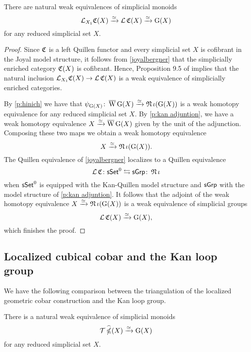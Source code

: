 \begin{lemma} \label{CandG}
	There are natural weak equivalences of simplicial monoids
	\[
	\operatorname{\mathcal{L}}_{X_1} \! \operatorname{\mathfrak{C}}(X) \xrightarrow{\simeq} \operatorname{\mathcal{L}} \operatorname{\mathfrak{C}}(X) \xrightarrow{\simeq} \operatorname{G}(X)
	\]
	for any reduced simplicial set $X$.
\end{lemma}

\begin{proof}
	Since $\operatorname{\mathfrak{C}}$ is a left Quillen functor and every simplicial set $X$ is cofibrant in the Joyal model structure, it follows from \cref{joyalbergner} that the simplicially enriched category $\operatorname{\mathfrak{C}}(X)$ is cofibrant.
	Hence, Proposition 9.5 of \cite{dwyer1980simplicial} implies that the natural inclusion $\operatorname{\mathcal{L}}_{X_1} \! \operatorname{\mathfrak{C}}(X) \to \operatorname{\mathcal{L}} \operatorname{\mathfrak{C}}(X)$ is a weak equivalence of simplicially enriched categories.

	By \cref{p:hinich} we have that $\psi_{\operatorname{G}(X)} \colon \operatorname{\overline{W}} \operatorname{G}(X) \xrightarrow{\simeq} \operatorname{\mathfrak{N}} \iota(\operatorname{G}(X))$ is a weak homotopy equivalence for any reduced simplicial set $X$.
	By \cref{p:kan adjuntion}, we have a weak homotopy equivalence $X \xrightarrow{\simeq} \operatorname{\overline{W}} \operatorname{G}(X)$ given by the unit of the adjunction.
	Composing these two maps we obtain a weak homotopy equivalence
	\[
	X \xrightarrow{\simeq} \operatorname{\mathfrak{N}}\iota(\operatorname{G}(X)).
	\]
	The Quillen equivalence of \cref{joyalbergner} localizes to a Quillen equivalence
	\[
	\operatorname{\mathcal{L}} \operatorname{\mathfrak{C}} \colon \mathsf{sSet}^0 \leftrightarrows \mathsf{sGrp} \colon \operatorname{\mathfrak{N}} \iota
	\]
	when $\mathsf{sSet}^0$ is equipped with the Kan-Quillen model structure and $\mathsf{sGrp}$ with the model structure of \cref{p:kan adjuntion}.
	It follows that the adjoint of the weak homotopy equivalence $X \xrightarrow{\simeq} \operatorname{\mathfrak{N}} \iota(\operatorname{G}(X))$ is a weak equivalence of simplicial groups
	\[
	\operatorname{\mathcal{L}} \operatorname{\mathfrak{C}}(X) \xrightarrow{\simeq} \operatorname{G}(X),
	\]
	which finishes the proof.
\end{proof}


\subsection{Localized cubical cobar and the Kan loop group}

We have the following comparison between the triangulation of the localized geometric cobar construction and the Kan loop group.

\begin{corollary} \label{widehatgcobarandG}
	There is a natural weak equivalence of simplicial monoids
	\[
	\mathcal{T} \operatorname{\widehat{\mathbb{\Omega}}}(X) \xrightarrow{\simeq} \operatorname{G}(X)
	\]
	for any reduced simplicial set $X$.
\end{corollary}

